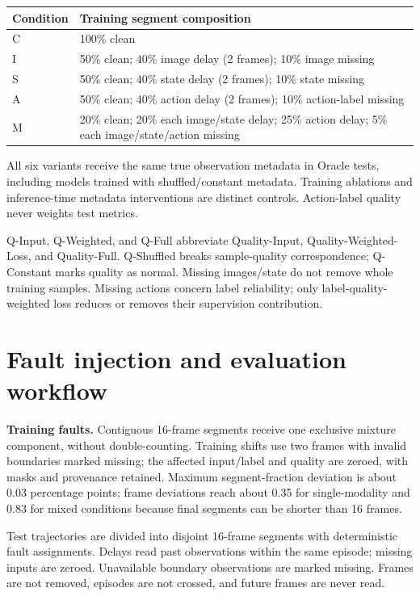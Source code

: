 \documentclass[11pt,a4paper]{article}
\newcommand{\note}[1]{\begin{tcolorbox}[colback=panel,colframe=rule,boxrule=0.5pt,arc=1mm]#1\end{tcolorbox}}
\begin{document}
\begin{center}
\footnotesize
\begin{tabular}{lp{133mm}}
\toprule
Condition & Training segment composition \\
\midrule
C & 100\% clean \\
I & 50\% clean; 40\% image delay (2 frames); 10\% image missing \\
S & 50\% clean; 40\% state delay (2 frames); 10\% state missing \\
A & 50\% clean; 40\% action delay (2 frames); 10\% action-label missing \\
M & 20\% clean; 20\% each image/state delay; 25\% action delay; 5\% each image/state/action missing \\
\bottomrule
\end{tabular}
\end{center}
\note{All six variants receive the same true observation metadata in Oracle tests, including models trained with shuffled/constant metadata. Training ablations and inference-time metadata interventions are distinct controls. Action-label quality never weights test metrics.}
Q-Input, Q-Weighted, and Q-Full abbreviate Quality-Input, Quality-Weighted-Loss, and Quality-Full. Q-Shuffled breaks sample-quality correspondence; Q-Constant marks quality as normal. Missing images/state do not remove whole training samples. Missing actions concern label reliability; only label-quality-weighted loss reduces or removes their supervision contribution.

\clearpage\section{Fault injection and evaluation workflow}
\textbf{Training faults.} Contiguous 16-frame segments receive one exclusive mixture component, without double-counting. Training shifts use two frames with invalid boundaries marked missing; the affected input/label and quality are zeroed, with masks and provenance retained. Maximum segment-fraction deviation is about 0.03 percentage points; frame deviations reach about 0.35 for single-modality and 0.83 for mixed conditions because final segments can be shorter than 16 frames.

Test trajectories are divided into disjoint 16-frame segments with deterministic fault assignments. Delays read past observations within the same episode; missing inputs are zeroed. Unavailable boundary observations are marked missing. Frames are not removed, episodes are not crossed, and future frames are never read.
\end{document}
